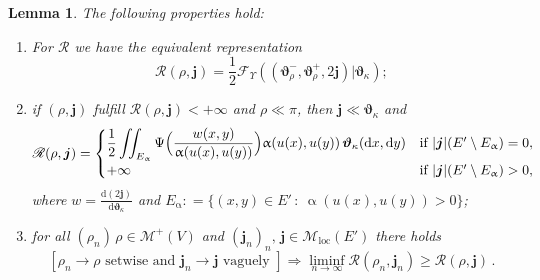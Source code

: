 \documentclass[11pt,reqno]{amsart}
\numberwithin{equation}{section}
\newcommand{\calF}{\mathcal{F}}
\newcommand{\calM}{\mathcal{M}}
\newcommand{\dd}{\mathrm{d}}
\newtheorem{lemma}[theorem]{Lemma}
\theoremstyle{definition}
\def\dd{\mathrm{d}}
\newcommand{\teta}{\boldsymbol \vartheta}
\newcommand{\tetapi}{\boldsymbol{\teta}_{\kappa}}
\newcommand{\pinfty}{{+\infty}}
\def\calF{\mathscr F}
\newcommand{\bj}{{\boldsymbol j}}
\newcommand{\scrR}{\mathscr{R}}
\newcommand{\Ed}{{E'}}
\newcommand{\Mloc}{\mathcal{M}_{\mathrm{loc}}}
\numberwithin{equation}{section}
\begin{document}
\begin{lemma}
The following properties hold:
\begin{enumerate}
\item
For $\scrR$ we have the equivalent representation
\begin{equation}
\label{equivalent-upsilon}
\scrR(\rho,\bj) = \frac12 \calF_\Upsilon ((\teta_\rho^-,\teta_\rho^+,2 \bj)|\tetapi);
\end{equation}
\item if $(\rho,\bj)$ fulfill $\scrR(\rho,\bj)<+\infty$ and $\rho \ll \pi$, then $\bj \ll \tetapi$ and 
\begin{equation}
\label{nice-representation}
\scrR(\rho,\bj)  =  \begin{cases}
    \displaystyle
    \frac12\iint_{E_\upalpha}%
    \Psi\Bigl(\frac{w(x,y)}{\upalpha(u(x),u(y))}\Bigr)\upalpha(u(x),u(y))\,\tetapi(\dd
    x,\dd y) &\text{if }|\bj |(\Ed\setminus E_\upalpha)
    =0,\\
    \pinfty&\text{if }|\bj |(\Ed\setminus E_\upalpha)>0, %
  \end{cases}
\end{equation}
where $w=\frac{\dd( 2\bj)}{\dd \tetapi}$ and $E_\upalpha: = \{ (x,y)\in \Ed\, : \ \upalpha(u(x),u(y))>0\}$;
 \item for all  $(\rho_n)\, \rho \in \calM^+(V)$ and $(\bj_n)_n,\, \bj \in \Mloc(E') $ there holds
 \begin{equation}
 \label{R-lsc}
\left[ \rho_n \to \rho \text{ setwise  and } \bj_n \to \bj \text{ vaguely } \right] \Longrightarrow \liminf_{n\to\infty} \scrR(\rho_n,\bj_n) \geq \scrR(\rho,\bj)\,.
 \end{equation}
 \end{enumerate}
\end{lemma}
\end{document}
